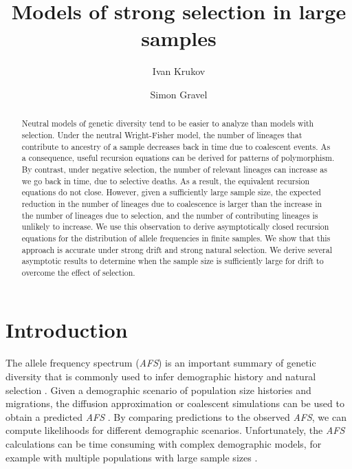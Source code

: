 \documentclass[review]{elsarticle}
\begin{document}
\begin{frontmatter}
  \title{Models of strong selection in large samples}

  \author{Ivan Krukov}
  \author{Simon Gravel}

  \begin{abstract}
    
    Neutral models of genetic diversity tend to be easier to analyze than models with selection.
    Under the neutral Wright-Fisher model, the number of lineages that contribute to ancestry of a
    sample decreases back in time due to coalescent events. As a consequence, useful recursion
    equations can be derived for patterns of polymorphism. By contrast, under negative selection,
    the number of relevant lineages can increase as we go back in time, due to selective deaths. As
    a result, the equivalent recursion equations do not close. However, given a sufficiently large
    sample size, the expected reduction in the number of lineages due to coalescence is larger than the
    increase in the number of lineages due to selection, and the number of contributing lineages is
    unlikely to increase. We use this observation to derive asymptotically closed recursion
    equations for the distribution of allele frequencies in finite samples. We show that this
    approach is accurate under strong drift and strong natural selection. We derive several
    asymptotic results to determine when the sample size is sufficiently large for drift to
    overcome the effect of selection.
  \end{abstract}

\end{frontmatter}

\section{Introduction}
\label{sec:introduciton}

The allele frequency spectrum (\textit{AFS}) is an important summary of genetic diversity that is
commonly used to infer demographic history and natural selection \citep{}. Given a demographic
scenario of population size histories and migrations, the diffusion approximation or coalescent
simulations can be used to obtain a predicted \textit{AFS} \citep{}. By comparing
predictions to the observed \textit{AFS}, we can compute likelihoods for different demographic
scenarios. Unfortunately, the \textit{AFS} calculations can be time consuming with complex
demographic models, for example with multiple populations with large sample sizes \citep{}.
\end{document}
